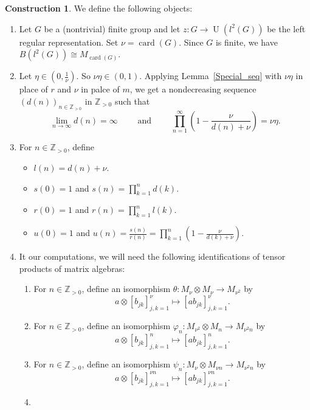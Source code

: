 \documentclass[10pt]{amsart}
\numberwithin{equation}{section}
\theoremstyle{definition}
\newtheorem{ctn}[thm]{Construction}
\newcommand{\N}{{\mathbb{Z}}_{> 0}}
\newcommand{\card}{{\operatorname{card}}}
\newcommand{\U}{{\operatorname{U}}}
\begin{document}
%
\begin{ctn}\label{Ctn}
We define the following objects:
\begin{enumerate}
\item\label{Ctn_1}
Let $G$ be a (nontrivial) finite group  and 
let $z \colon G \to \U (l^2 (G))$ be the left regular  representation. Set $\nu=\card (G)$.
Since $G$ is finite, we have $B (l^2 (G)) \cong M_{\card (G)}$.
%
\item\label{Ctn_2}
Let $\eta\in \left(0, \frac{1}{\nu}\right)$. So $\nu \eta\in (0, 1)$.
Applying  Lemma~\ref{Special_seq} with $\nu \eta$ in place of $r$ and $\nu$ in palce of $m$,
we get a nondecreasing sequence
 $(d(n))_{n \in \N}$ in $\N$ such that 
\begin{equation*}
 \lim_{n \to \infty} d(n)= \infty
\qquad
\mbox{ and }
\qquad
 \prod_{n = 1}^{\infty} \left( 1 -  \frac{\nu}{d(n)+\nu} \right) = \nu \eta.
\end{equation*}
% 
\item\label{Ctn_3}
For $n \in \N$, define
\begin{itemize}
\item
$l(n) =  d(n) + \nu$.
\item
$s(0)=1$ and $s (n) = \prod_{k = 1}^n d(k)$.
\item
$r(0)=1$ and $r (n) = \prod_{k = 1}^n l(k)$.
\item
$u (0)=1$ and 
$u (n)
 = \frac{s (n)}{r (n)}
 = \prod_{k = 1}^n \left(1 - \frac{\nu}{ d(k) + \nu} \right)$.
\end{itemize}
\item\label{Ctn_4}
It our computations, we will need
the following identifications of tensor products of matrix algebras:
\begin{enumerate}
\item\label{Ctn_4.ITN1}
For $n\in \N$, define an  isomorphism $\theta \colon M_{\nu} \otimes M_{\nu} \to M_{\nu^2}$ by 
\[
a \otimes [b_{jk}]_{j,k =1}^{\nu}  \mapsto \left[a b_{jk} \right]_{j,k =1}^{\nu}.
\]
\item\label{Ctn_4.ITN2}
For $n \in \N$, define an  isomorphism $\varphi_{n} \colon M_{\nu^2} \otimes M_{n} \to M_{\nu^2 n}$ by 
\[
a \otimes [b_{jk}]_{j, k =1}^{n}  \mapsto \left[a b_{jk} \right]_{j,k =1}^{n}.
\]
\item\label{Ctn_4.ITN3}
For $n \in \N$, define an  isomorphism $\psi_{n} \colon M_{\nu} \otimes M_{\nu n} \to M_{\nu^2 n}$ by 
\[
a  \otimes  [b_{jk}]_{j,k =1}^{\nu n}
\mapsto
 \left[a b_{jk} \right]_{j, k =1}^{\nu n}.
\]
\item\label{Ctn_4.ITN4}

\end{enumerate}
\end{enumerate}
\end{ctn}
\end{document}
